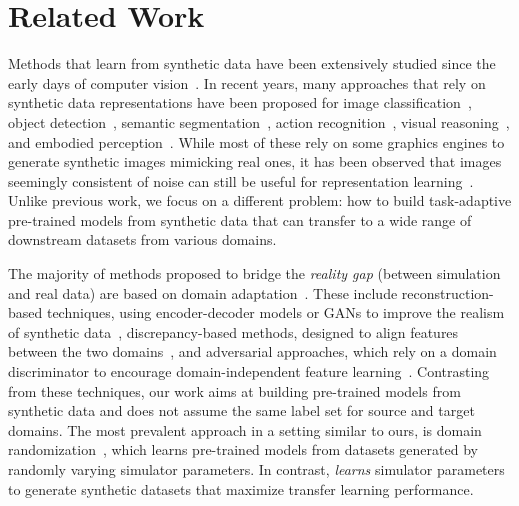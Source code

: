 \vspace{-1mm}
\section{Related Work} \label{sec:related_work}

 Methods that learn from synthetic data have been extensively studied since the early days of computer vision~\cite{nevatia1977description,little1988analysis}. In recent years,  many approaches that rely on synthetic data representations have been proposed for image classification~\cite{mikami2021scaling,gan2020threedworld}, object detection~\cite{peng2015learning,prakash2019structured}, semantic segmentation~\cite{wang2020differential,ros2016synthia}, action recognition~\cite{varol2021synthetic,roberto2017procedural}, visual reasoning~\cite{johnson2017clevr}, and embodied perception~\cite{savva2019habitat,kolve2017ai2,xia2018gibson}. While most of these rely on some graphics engines to generate synthetic images mimicking real ones, it has been observed that images seemingly consistent of noise can still be useful for representation learning~\cite{baradad2021learning}.
Unlike previous work, we focus on a different problem: how to build task-adaptive pre-trained models from synthetic data that can transfer to a wide range of downstream datasets from various domains.



\vspace{1mm}
 The majority of methods proposed to bridge the {\em reality gap} (between simulation and real data) are based on domain adaptation~\cite{csurka2017domain}. These include reconstruction-based techniques, using encoder-decoder models or GANs to improve the realism of synthetic data~\cite{richter2021enhancing,hoffman2018cycada,shrivastava2017learning},  discrepancy-based methods, designed to align features between the two domains~\cite{rozantsev2018beyond,zhang2019curriculum}, and adversarial approaches, which rely on a domain discriminator to encourage domain-independent feature learning~\cite{ren2018cross, ganin2016domain,tzeng2017adversarial}. Contrasting from these techniques, our work aims at building pre-trained models from synthetic data and does not assume the same label set for source and target domains. 
The most prevalent approach in a setting similar to ours, is domain randomization~\cite{tobin2017domain, prakash2019structured,yue2019domain,anderson2021sim,khirodkar2019domain}, which learns pre-trained models from datasets generated by randomly varying simulator parameters. In contrast, \ours \textit{learns} simulator parameters to generate synthetic datasets that maximize transfer learning performance.

